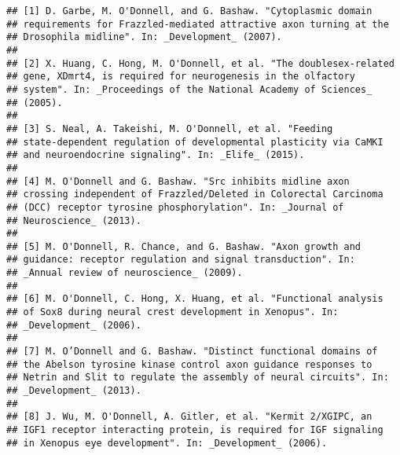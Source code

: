\documentclass[11pt,a4paper,]{moderncv}
\newcounter{papers}
\begin{document}
\begin{verbatim}
## [1] D. Garbe, M. O'Donnell, and G. Bashaw. "Cytoplasmic domain
## requirements for Frazzled-mediated attractive axon turning at the
## Drosophila midline". In: _Development_ (2007).
## 
## [2] X. Huang, C. Hong, M. O'Donnell, et al. "The doublesex-related
## gene, XDmrt4, is required for neurogenesis in the olfactory
## system". In: _Proceedings of the National Academy of Sciences_
## (2005).
## 
## [3] S. Neal, A. Takeishi, M. O'Donnell, et al. "Feeding
## state-dependent regulation of developmental plasticity via CaMKI
## and neuroendocrine signaling". In: _Elife_ (2015).
## 
## [4] M. O'Donnell and G. Bashaw. "Src inhibits midline axon
## crossing independent of Frazzled/Deleted in Colorectal Carcinoma
## (DCC) receptor tyrosine phosphorylation". In: _Journal of
## Neuroscience_ (2013).
## 
## [5] M. O'Donnell, R. Chance, and G. Bashaw. "Axon growth and
## guidance: receptor regulation and signal transduction". In:
## _Annual review of neuroscience_ (2009).
## 
## [6] M. O'Donnell, C. Hong, X. Huang, et al. "Functional analysis
## of Sox8 during neural crest development in Xenopus". In:
## _Development_ (2006).
## 
## [7] M. O’Donnell and G. Bashaw. "Distinct functional domains of
## the Abelson tyrosine kinase control axon guidance responses to
## Netrin and Slit to regulate the assembly of neural circuits". In:
## _Development_ (2013).
## 
## [8] J. Wu, M. O'Donnell, A. Gitler, et al. "Kermit 2/XGIPC, an
## IGF1 receptor interacting protein, is required for IGF signaling
## in Xenopus eye development". In: _Development_ (2006).
\end{verbatim}

\newrefcontext[sorting=none]\setcounter{papers}{0}\pagebreak[3]
\printbibliography[category=bib-MOD.bib-4720237,heading=none]\setcounter{papers}{0}

\nocite{1,
2,
3,
4,
5,
6,
7,
8}
\end{document}
